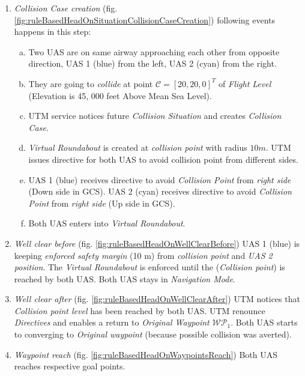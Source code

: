\begin{enumerate}
    \item\emph{Collision Case creation} (fig. \ref{fig:ruleBasedHeadOnSituationCollisionCaseCreation}) following events happens in this step:
    \begin{enumerate}[a.]
        \item Two UAS are on same airway approaching each other from opposite direction, UAS 1 (blue) from the left, UAS 2 (cyan) from the right.
        
        \item They are going to \emph{collide} at point $\mathscr{C}=[20,20,0]^T$ of \emph{Flight Level} (Elevation is 45, 000 feet Above Mean Sea Level).
        
        \item UTM service notices future \emph{Collision Situation} and creates \emph{Collision Case}.
        
        \item \emph{Virtual Roundabout} is created at \emph{collision point} with radius $10 m$. UTM issues directive for both UAS to avoid collision point from different sides.
        
        \item UAS 1 (blue) receives directive to avoid \emph{Collision Point} from \emph{right side} (Down side in GCS). UAS 2 (cyan) receives directive to avoid \emph{Collision Point} from \emph{right side} (Up side in GCS).

        \item Both UAS enters into \emph{Virtual Roundabout}.
    \end{enumerate}
    
    \item\emph{Well clear before} (fig. \ref{fig:ruleBasedHeadOnWellClearBefore}) UAS 1 (blue) is keeping \emph{enforced safety margin} (10 m) from \emph{collision point} and \emph{UAS 2 position}. The \emph{Virtual Roundabout} is enforced until the (\emph{Collision point}) is reached by both UAS. Both UAS stays in \emph{Navigation Mode}.
    
    \item\emph{Well clear after} (fig. \ref{fig:ruleBasedHeadOnWellClearAfter}) UTM notices that \emph{Collision point level} has been reached by both UAS. UTM renounce \emph{Directives} and enables a return to \emph{Original Waypoint} $\mathscr{WP}_1$. Both UAS starts to converging to \emph{Original waypoint} (because possible collision was averted).
    
    \item\emph{Waypoint reach} (fig. \ref{fig:ruleBasedHeadOnWaypointsReach}) Both UAS reaches respective goal points.
\end{enumerate}

